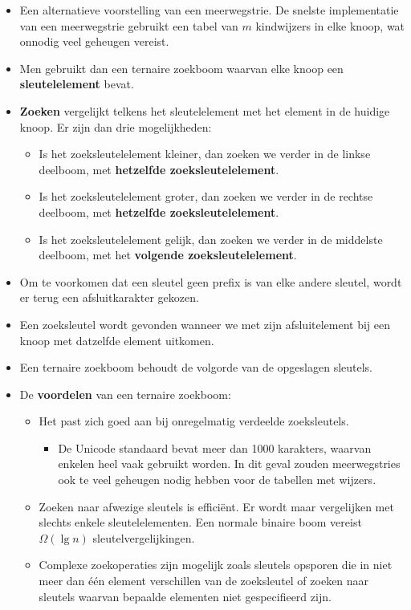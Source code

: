 \begin{itemize}
    \item Een alternatieve voorstelling van een meerwegstrie.
    \alert De snelste implementatie van een meerwegstrie gebruikt een tabel van $m$ kindwijzers in elke knoop, wat onnodig veel geheugen vereist.
    \item Men gebruikt dan een ternaire zoekboom waarvan elke knoop een \textbf{sleutelelement} bevat.
    \item \textbf{Zoeken} vergelijkt telkens het sleutelelement met het element in de huidige knoop. Er zijn dan drie mogelijkheden:
    \begin{itemize}
        \item Is het zoeksleutelelement kleiner, dan zoeken we verder in de linkse deelboom, met \textbf{hetzelfde zoeksleutelelement}.
        \item Is het zoeksleutelelement groter, dan zoeken we verder in de rechtse deelboom, met \textbf{hetzelfde zoeksleutelelement}.
        \item Is het zoeksleutelelement gelijk, dan zoeken we verder in de middelste deelboom, met het \textbf{volgende zoeksleutelelement}.
    \end{itemize}
    \item Om te voorkomen dat een sleutel geen prefix is van elke andere sleutel, wordt er terug een afsluitkarakter gekozen.
    \item Een zoeksleutel wordt gevonden wanneer we met zijn afsluitelement bij een knoop met datzelfde element uitkomen.
    \item Een ternaire zoekboom behoudt de volgorde van de opgeslagen sleutels.
    \item De \textbf{voordelen} van een ternaire zoekboom:
    \begin{itemize}
        \item Het past zich goed aan bij onregelmatig verdeelde zoeksleutels.
        \begin{itemize}
            \item De Unicode standaard bevat meer dan 1000 karakters, waarvan enkelen heel vaak gebruikt worden. In dit geval zouden meerwegstries ook te veel geheugen nodig hebben voor de tabellen met wijzers.
        \end{itemize}
        \item Zoeken naar afwezige sleutels is efficiënt. Er wordt maar vergelijken met slechts enkele sleutelelementen. Een normale binaire boom vereist $\Omega(\lg n)$ sleutelvergelijkingen.
        \item Complexe zoekoperaties zijn mogelijk zoals sleutels opsporen die in niet meer dan één element verschillen van de zoeksleutel of zoeken naar sleutels waarvan bepaalde elementen niet gespecifieerd zijn.
    \end{itemize}


\end{itemize}
